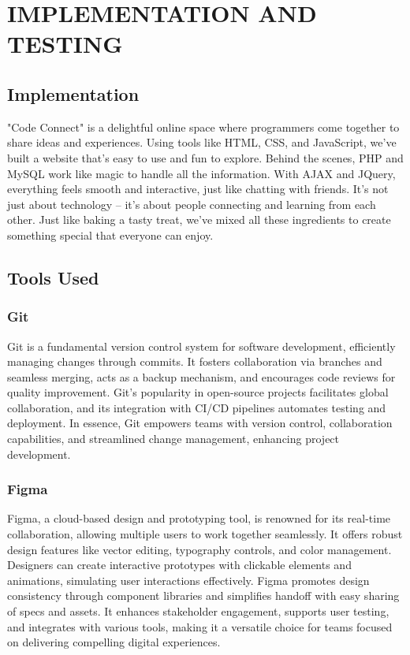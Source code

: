 \chapter{IMPLEMENTATION AND TESTING}
\section{Implementation}
"Code Connect" is a delightful online space where programmers come together to share ideas and experiences. Using tools like HTML, CSS, and JavaScript, we've built a website that's easy to use and fun to explore. Behind the scenes, PHP and MySQL work like magic to handle all the information. With AJAX and JQuery, everything feels smooth and interactive, just like chatting with friends. It's not just about technology – it's about people connecting and learning from each other. Just like baking a tasty treat, we've mixed all these ingredients to create something special that everyone can enjoy.





\section{Tools Used}
\subsection{Git}
Git is a fundamental version control system for software development, efficiently managing changes through commits. It fosters collaboration via branches and seamless merging, acts as a backup mechanism, and encourages code reviews for quality improvement. Git's popularity in open-source projects facilitates global collaboration, and its integration with CI/CD pipelines automates testing and deployment. In essence, Git empowers teams with version control, collaboration capabilities, and streamlined change management, enhancing project development.
\subsection{Figma}
Figma, a cloud-based design and prototyping tool, is renowned for its real-time collaboration, allowing multiple users to work together seamlessly. It offers robust design features like vector editing, typography controls, and color management. Designers can create interactive prototypes with clickable elements and animations, simulating user interactions effectively. Figma promotes design consistency through component libraries and simplifies handoff with easy sharing of specs and assets. It enhances stakeholder engagement, supports user testing, and integrates with various tools, making it a versatile choice for teams focused on delivering compelling digital experiences.
